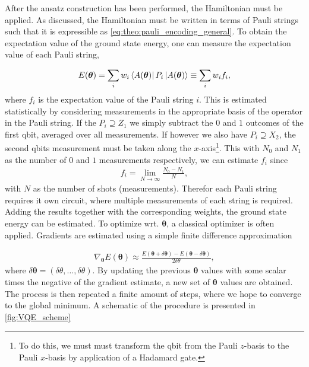 After the ansatz construction has been performed, the Hamiltonian must be applied. As discussed, the Hamiltonian must be written in terms of Pauli strings such that it is expressible as \cref{eq:theo:pauli_encoding_general}. To obtain the expectation value of the ground state energy, one can measure the expectation value of each Pauli string,

\begin{align*}
    E(\boldsymbol{\theta}) = \sum_i w_i\bra{A(\boldsymbol{\theta})} P_i \ket{A(\boldsymbol{\theta})} \equiv \sum_i w_i f_i,
\end{align*}
where $f_i$ is the expectation value of the Pauli string $i$. This is estimated statistically by considering measurements in the appropriate basis of the operator in the Pauli string. If the $P_i \supseteq Z_1$ we simply subtract the $0$ and $1$ outcomes of the first qbit, averaged over all measurements. If however we also have $P_i \supseteq X_2$, the second qbits measurement must be taken along the $x$-axis\footnote{To do this, we must must transform the qbit from the Pauli $z$-basis to the Pauli $x$-basis by application of a Hadamard gate.}. This with $N_0$ and $N_1$ as the number of $0$ and $1$ measurements respectively, we can estimate $f_i$ since 
\begin{align*}
    f_i = \lim_{N \to \infty} \frac{N_0 - N_1}{N},
\end{align*}
with $N$ as the number of shots (measurements). Therefor each Pauli string requires it own circuit, where multiple measurements of each string is required. Adding the results together with the corresponding weights, the ground state energy can be estimated. To optimize wrt. $\boldsymbol{\theta}$, a classical optimizer is often applied. Gradients are estimated using a simple finite difference approximation

\begin{align}
    \nabla_{\boldsymbol{\theta}} E(\boldsymbol{\theta}) \approx \frac{E(\boldsymbol{\theta} + \delta \boldsymbol{\theta})-E(\boldsymbol{\theta} - \delta \boldsymbol{\theta})}{2\delta \theta} ,
\end{align}
where $\delta \boldsymbol{\theta} = (\delta \theta, \ldots, \delta \theta)$. By updating the previous $\boldsymbol{\theta}$ values with some scalar times the negative of the gradient estimate, a new set of $\boldsymbol{\theta}$ values are obtained. The process is then repeated a finite amount of steps, where we hope to converge to the global minimum. A schematic of the procedure is presented in \cref{fig:VQE_scheme}

